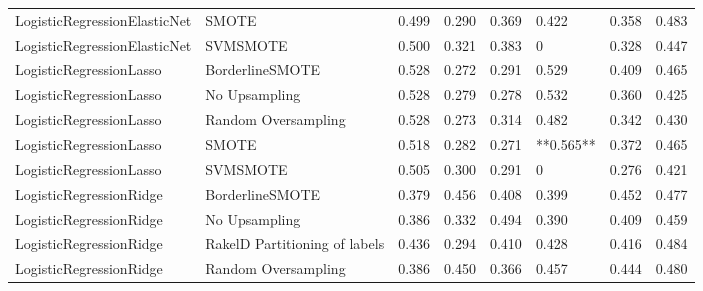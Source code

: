 \begin{tabular}{llllllll}
   LogisticRegressionElasticNet &                         SMOTE & 0.499 &                     0.290 &                 0.369 &                  0.422 &                                   0.358 &    0.483 \\
   LogisticRegressionElasticNet &                      SVMSMOTE & 0.500 &                     0.321 &                 0.383 &                      0 &                                   0.328 &    0.447 \\
        LogisticRegressionLasso &               BorderlineSMOTE & 0.528 &                     0.272 &                 0.291 &                  0.529 &                                   0.409 &    0.465 \\
        LogisticRegressionLasso &                 No Upsampling & 0.528 &                     0.279 &                 0.278 &                  0.532 &                                   0.360 &    0.425 \\
        LogisticRegressionLasso &           Random Oversampling & 0.528 &                     0.273 &                 0.314 &                  0.482 &                                   0.342 &    0.430 \\
        LogisticRegressionLasso &                         SMOTE & 0.518 &                     0.282 &                 0.271 &              **0.565** &                                   0.372 &    0.465 \\
        LogisticRegressionLasso &                      SVMSMOTE & 0.505 &                     0.300 &                 0.291 &                      0 &                                   0.276 &    0.421 \\
        LogisticRegressionRidge &               BorderlineSMOTE & 0.379 &                     0.456 &                 0.408 &                  0.399 &                                   0.452 &    0.477 \\
        LogisticRegressionRidge &                 No Upsampling & 0.386 &                     0.332 &                 0.494 &                  0.390 &                                   0.409 &    0.459 \\
        LogisticRegressionRidge & RakelD Partitioning of labels & 0.436 &                     0.294 &                 0.410 &                  0.428 &                                   0.416 &    0.484 \\
        LogisticRegressionRidge &           Random Oversampling & 0.386 &                     0.450 &                 0.366 &                  0.457 &                                   0.444 &    0.480 \\

\end{tabular}
